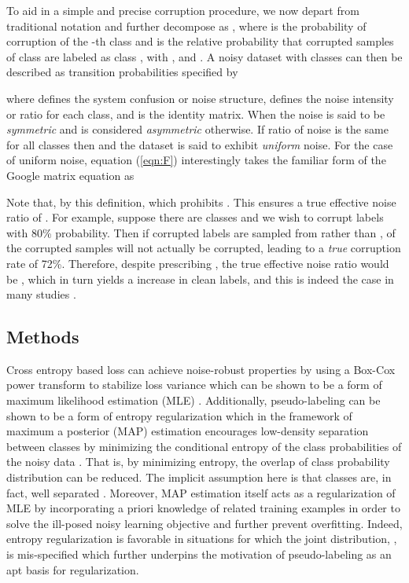\documentclass{article}
\begin{document}
To aid in a simple and precise corruption procedure, we now depart from traditional notation and further decompose  as , where  is the probability of corruption of the -th class and  is the relative probability that corrupted samples of class  are labeled as class , with ,  and .  A noisy dataset with  classes can then be described as transition probabilities specified by

where  defines the system confusion or noise structure,  defines the noise intensity or ratio for each class, and  is the identity matrix.  When  the noise is said to be \emph{symmetric} and is considered \emph{asymmetric} otherwise. If ratio of noise is the same for all classes then  and the dataset is said to exhibit \emph{uniform} noise.  For the case of uniform noise, equation (\ref{eqn:F}) interestingly takes the familiar form of the Google matrix equation \cite{RevModPhys.87.1261} as

Note that, by this definition,  which prohibits .  This ensures a true effective noise ratio of .  For example, suppose there are  classes and we wish to corrupt labels with 80\% probability. Then if corrupted labels are sampled from  rather than ,  of the corrupted samples will not actually be corrupted, leading to a \emph{true} corruption rate of 72\%.  Therefore, despite prescribing , the true effective noise ratio would be , which in turn yields a  increase in clean labels, and this is indeed the case in many studies \cite{zhang2018,nguyen2020,li2020, zhang2020}.

\subsection{Methods}
\label{sec:methods}
Cross entropy based loss can achieve noise-robust properties by using a Box-Cox power transform to stabilize loss variance which can be shown to be a form of maximum likelihood estimation (MLE) \cite{ferrari2010}.  Additionally, pseudo-labeling \cite{10.2307/2285824} can be shown to be a form of entropy regularization \cite{Grandvalet2005} which in the framework of maximum a posterior (MAP) estimation encourages low-density separation between classes by minimizing the conditional entropy of the class probabilities of the noisy data \cite{Lee2013}.  That is, by minimizing entropy, the overlap of class probability distribution can be reduced.  The implicit assumption here is that classes are, in fact, well separated \cite{Chapelle2005}.  Moreover, MAP estimation itself acts as a regularization of MLE by incorporating a priori knowledge of related training examples in order to solve the ill-posed noisy learning objective and further prevent overfitting.  Indeed, entropy regularization is favorable in situations for which the joint distribution, , is mis-specified \cite{Grandvalet2005} which further underpins the motivation of pseudo-labeling as an apt basis for regularization. 
\end{document}
